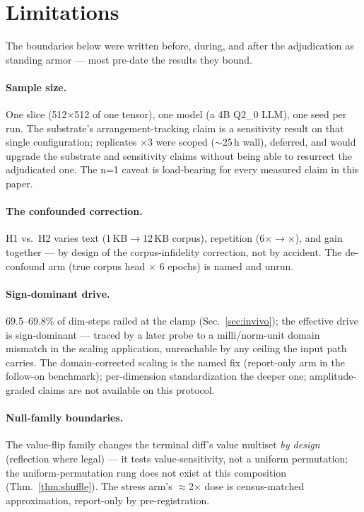 \section{Limitations}
\label{sec:limitations}

The boundaries below were written before, during, and after the
adjudication as standing armor --- most pre-date the results they
bound.

\paragraph{Sample size.} One slice (512$\times$512 of one tensor), one
model (a 4B Q2\_0 LLM), one seed per run. The substrate's
arrangement-tracking claim is a sensitivity result on that single
configuration; replicates $\times$3 were scoped ($\sim$25\,h wall),
deferred, and would upgrade the substrate and sensitivity claims
without being able to resurrect the adjudicated one. The n=1 caveat
is load-bearing for every measured claim in this paper.

\paragraph{The confounded correction.} H1 vs.\ H2 varies text
(1\,KB$\to$12\,KB corpus), \allowbreak repetition (6$\times\to$$\times$), and gain together --- by design of the corpus-infidelity
correction, not by accident. The de-confound arm (true corpus head $\times$ 6 epochs)
is named and unrun.

\paragraph{Sign-dominant drive.} 69.5--69.8\% of dim-steps railed at
the clamp (Sec.~\ref{sec:invivo}); the effective drive is
sign-dominant --- traced by a later probe to a milli/norm-unit domain
mismatch in the scaling application, unreachable by any ceiling the
input path carries. The domain-corrected scaling is the named fix
(report-only arm in the follow-on benchmark); per-dimension
standardization the deeper one; amplitude-graded claims are not
available on this protocol.

\paragraph{Null-family boundaries.} The value-flip family changes the
terminal diff's value multiset \emph{by design} (reflection where
legal) --- it tests value-sensitivity, not a uniform permutation; the
uniform-permutation rung does not exist at this composition
(Thm.~\ref{thm:shuffle}). The stress arm's $\approx$2$\times$ dose is
census-matched approximation, report-only by pre-registration.

